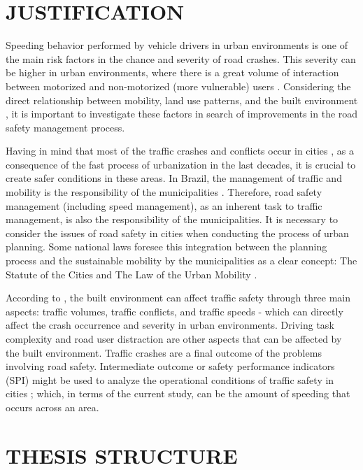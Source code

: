 \section{JUSTIFICATION}

Speeding behavior performed by vehicle drivers in urban environments is one of the main risk factors in the chance and severity of road crashes. This severity can be higher in urban environments, where there is a great volume of interaction between motorized and non-motorized (more vulnerable) users \cite{Elvik2009}. Considering the direct relationship between mobility, land use patterns, and the built environment \cite{DeVos2013}, it is important to investigate these factors in search of improvements in the road safety management process.

Having in mind that most of the traffic crashes and conflicts occur in cities \cite{WHO2018}, as a consequence of the fast process of urbanization in the last decades, it is crucial to create safer conditions in these areas. In Brazil, the management of traffic and mobility is the responsibility of the municipalities \cite{Brasil1997}. Therefore, road safety management (including speed management), as an inherent task to traffic management, is also the responsibility of the municipalities. It is necessary to consider the issues of road safety in cities when conducting the process of urban planning. Some national laws foresee this integration between the planning process and the sustainable mobility by the municipalities as a clear concept: The Statute of the Cities \cite{Brasil2001} and The Law of the Urban Mobility \cite{Brasil2012}.    

According to \textcite{Ewing2009}, the built environment can affect traffic safety through three main aspects: traffic volumes, traffic conflicts, and traffic speeds - which can directly affect the crash occurrence and severity in urban environments. Driving task complexity \cite{Onate-Vega2020} and road user distraction \cite{Chen2021} are other aspects that can be affected by the built environment. Traffic crashes are a final outcome of the problems involving road safety. Intermediate outcome or safety performance indicators (SPI) might be used to analyze the operational conditions of traffic safety in cities \cite{Bastos2014}; which, in terms of the current study, can be the amount of speeding that occurs across an area.

\section{THESIS STRUCTURE}

